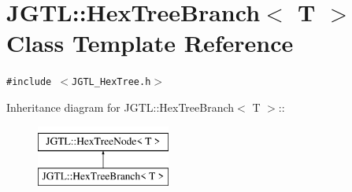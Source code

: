 \hypertarget{class_j_g_t_l_1_1_hex_tree_branch}{
\section{JGTL::Hex\-Tree\-Branch$<$ T $>$ Class Template Reference}
\label{class_j_g_t_l_1_1_hex_tree_branch}
}
{\tt \#include $<$JGTL\_\-Hex\-Tree.h$>$}

Inheritance diagram for JGTL::Hex\-Tree\-Branch$<$ T $>$::\begin{figure}[H]
\begin{center}
\leavevmode
\includegraphics[height=2cm]{class_j_g_t_l_1_1_hex_tree_branch}
\end{center}
\end{figure}
